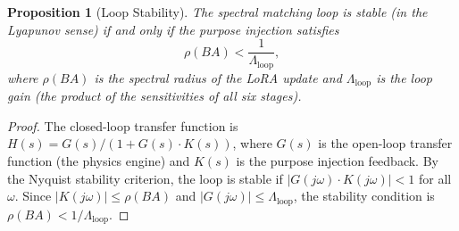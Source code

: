 \documentclass[11pt,twocolumn,a4paper]{article}
\newtheorem{proposition}[theorem]{Proposition}
\theoremstyle{definition}
\theoremstyle{remark}
\begin{document}
\begin{proposition}[Loop Stability]\label{prop:loop-stability}
The spectral matching loop is stable (in the Lyapunov sense) if and only if the purpose injection satisfies
\begin{equation}\label{eq:stability}
    \rho(BA) < \frac{1}{\Lambda_{\mathrm{loop}}},
\end{equation}
where $\rho(BA)$ is the spectral radius of the LoRA update and $\Lambda_{\mathrm{loop}}$ is the loop gain (the product of the sensitivities of all six stages).
\end{proposition}

\begin{proof}
The closed-loop transfer function is $H(s) = G(s) / (1 + G(s) \cdot K(s))$, where $G(s)$ is the open-loop transfer function (the physics engine) and $K(s)$ is the purpose injection feedback.  By the Nyquist stability criterion, the loop is stable if $|G(j\omega) \cdot K(j\omega)| < 1$ for all $\omega$.  Since $|K(j\omega)| \leq \rho(BA)$ and $|G(j\omega)| \leq \Lambda_{\mathrm{loop}}$, the stability condition is $\rho(BA) < 1/\Lambda_{\mathrm{loop}}$.
\end{proof}
\end{document}
